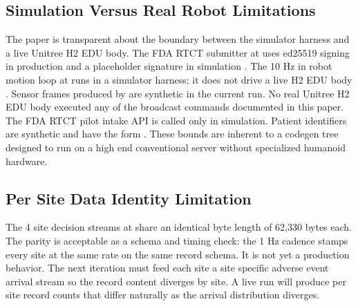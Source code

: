 %
%

\begin{sectionaccent}

\subsection{Simulation Versus Real Robot Limitations}
\label{sec:limits-sim}

The paper is transparent about the boundary between the simulator
harness and a live Unitree H2 EDU body. The FDA RTCT submitter at
 uses ed25519 signing
in production and a placeholder signature in simulation
\cite{fda_rtct_2026}. The 10 Hz in robot motion loop at
 runs in a simulator harness;
it does not drive a live H2 EDU body \cite{unitree_h2_2026}. Sensor
frames produced by  are
synthetic in the current run. No real Unitree H2 EDU body executed
any of the broadcast commands documented in this paper. The FDA RTCT
pilot intake API is called only in simulation. Patient identifiers
are synthetic and have the form . These bounds
are inherent to a codegen tree designed to run on a high end
conventional server without specialized humanoid hardware.

\subsection{Per Site Data Identity Limitation}
\label{sec:limits-parity}

The 4 site decision streams at
 share an identical
byte length of 62{,}330 bytes each. The parity is acceptable as a
schema and timing check: the 1 Hz cadence stamps every site at the
same rate on the same record schema. It is not yet a production
behavior. The next iteration must feed each site a site specific
adverse event arrival stream so the record content diverges by
site. A live run will produce per site record counts that differ
naturally as the arrival distribution diverges.


\end{sectionaccent}
